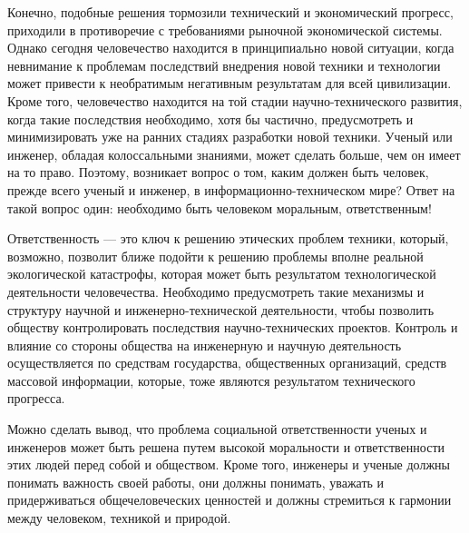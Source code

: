 Конечно, подобные решения тормозили технический и экономический прогресс, приходили в противоречие с требованиями рыночной экономической системы. Однако сегодня человечество находится в принципиально новой ситуации, когда невнимание к проблемам последствий внедрения новой техники и технологии может привести к необратимым негативным результатам для всей цивилизации. Кроме того, человечество находится на той стадии научно-технического развития, когда такие последствия необходимо, хотя бы частично, предусмотреть и минимизировать уже на ранних стадиях разработки новой техники.  Ученый или инженер, обладая колоссальными знаниями, может сделать больше, чем он имеет на то право. Поэтому, возникает вопрос о том, каким должен быть человек, прежде всего ученый и инженер, в информационно-техническом мире? Ответ на такой вопрос один: необходимо быть человеком моральным, ответственным!

Ответственность --- это ключ к решению этических проблем техники, который, возможно, позволит ближе подойти к решению проблемы вполне реальной экологической катастрофы, которая может быть результатом технологической деятельности человечества.  Необходимо предусмотреть такие механизмы и структуру научной и инженерно-технической деятельности, чтобы позволить обществу контролировать последствия научно-технических проектов. Контроль и влияние со стороны общества на инженерную и научную деятельность осуществляется по средствам государства, общественных организаций, средств массовой информации, которые, тоже являются результатом технического прогресса.

Можно сделать вывод, что проблема социальной ответственности ученых и инженеров может быть решена путем высокой моральности и ответственности этих людей перед собой и обществом. Кроме того, инженеры и ученые должны понимать важность своей работы, они должны понимать, уважать и придерживаться общечеловеческих ценностей и должны стремиться к гармонии между человеком, техникой и природой. 

